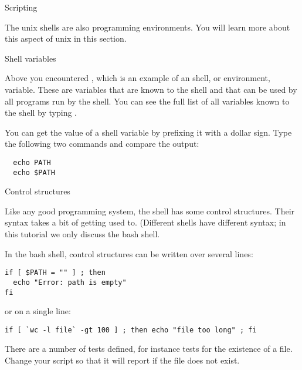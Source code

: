  {Scripting}
\label{sec:unix-script}

The unix shells are also programming environments. You will learn more
about this aspect of unix in this section.

 {Shell variables}

Above you encountered , which is an example of an
shell, or environment, variable. These are variables that are known to the shell
and that can be used by all programs run by the shell. You can see the
full list of all variables known to the shell by typing . 

You can get the value of a shell variable by prefixing it with
a dollar sign. Type the following two commands and compare the output:
\begin{verbatim}
  echo PATH
  echo $PATH
\end{verbatim}


 {Control structures}

Like any good programming system, the shell has some control
structures. Their syntax takes a bit of getting used to. (Different
shells have different syntax; in this tutorial we only discuss the
bash shell.

In the bash shell, control structures can be written over several
lines:
\begin{verbatim}
if [ $PATH = "" ] ; then
  echo "Error: path is empty"
fi
\end{verbatim}
or on a single line:
\begin{verbatim}
if [ `wc -l file` -gt 100 ] ; then echo "file too long" ; fi
\end{verbatim}
There are a number of tests defined, for instance 
tests for the existence of a file. Change your script so that it will
report  if the file does not exist.

